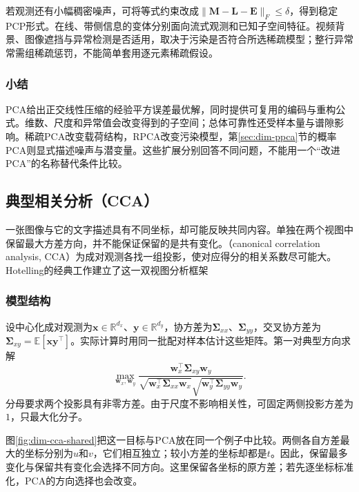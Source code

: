 若观测还有小幅稠密噪声，可将等式约束改成$\lVert\bm{M}-\bm{L}-\bm{E}\rVert_F\leq\delta$，得到稳定PCP形式。在线、带侧信息的变体分别面向流式观测和已知子空间特征。视频背景、图像遮挡与异常检测是否适用，取决于污染是否符合所选稀疏模型；整行异常常需组稀疏惩罚，不能简单套用逐元素稀疏假设。

\subsubsection{小结}
\label{sec:dim-pca-summary}

PCA给出正交线性压缩的经验平方误差最优解，同时提供可复用的编码与重构公式。维数、尺度和异常值会改变得到的子空间；总体可靠性还受样本量与谱隙影响。稀疏PCA改变载荷结构，RPCA改变污染模型，第\ref{sec:dim-ppca}节的概率PCA则显式描述噪声与潜变量。这些扩展分别回答不同问题，不能用一个“改进PCA”的名称替代条件比较。

\subsection{典型相关分析（CCA）}
\label{sec:dim-cca}

一张图像与它的文字描述具有不同坐标，却可能反映共同内容。单独在两个视图中保留最大方差方向，并不能保证保留的是共有变化。（canonical correlation analysis, CCA）为成对观测各找一组投影，使对应得分的相关系数尽可能大。Hotelling的经典工作建立了这一双视图分析框架

\subsubsection{模型结构}
\label{sec:dim-cca-structure}

设中心化成对观测为$\bm{x}\in\mathbb{R}^{d_x}$、$\bm{y}\in\mathbb{R}^{d_y}$，协方差为$\bm{\Sigma}_{xx}$、$\bm{\Sigma}_{yy}$，交叉协方差为$\bm{\Sigma}_{xy}=\mathbb{E}[\bm{x}\bm{y}^{\top}]$。实际计算时用同一批配对样本估计这些矩阵。第一对典型方向求解
\begin{equation}
  \max_{\bm{w}_x,\bm{w}_y}
  \frac{\bm{w}_x^{\top}\bm{\Sigma}_{xy}\bm{w}_y}
  {\sqrt{\bm{w}_x^{\top}\bm{\Sigma}_{xx}\bm{w}_x}
   \sqrt{\bm{w}_y^{\top}\bm{\Sigma}_{yy}\bm{w}_y}}.
  \label{eq:dim-cca-correlation}
\end{equation}
分母要求两个投影具有非零方差。由于尺度不影响相关性，可固定两侧投影方差为$1$，只最大化分子。

图\ref{fig:dim-cca-shared}把这一目标与PCA放在同一个例子中比较。两侧各自方差最大的坐标分别为$u$和$v$，它们相互独立；较小方差的坐标却都是$t$。因此，保留最多变化与保留共有变化会选择不同方向。这里保留各坐标的原方差；若先逐坐标标准化，PCA的方向选择也会改变。

